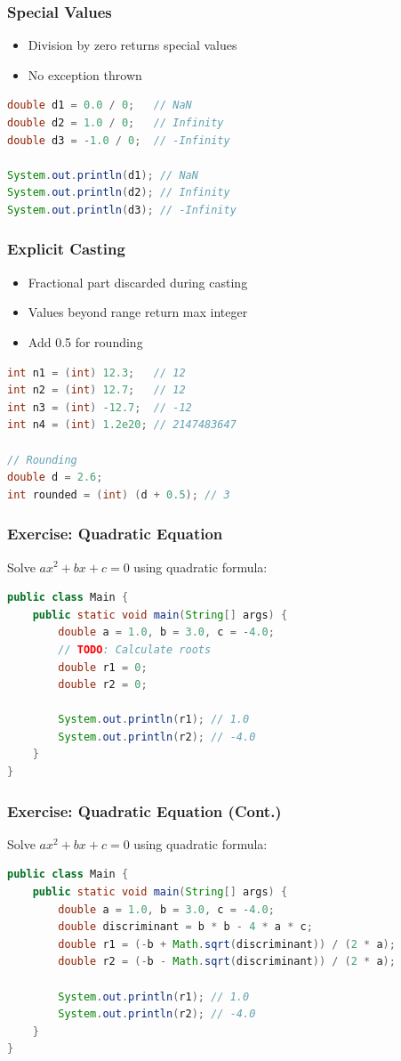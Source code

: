 \documentclass[serif, aspectratio=169]{beamer}
\begin{document}
\begin{frame}[fragile]
\frametitle{Special Values}
\begin{itemize}
    \item Division by zero returns special values
    \item No exception thrown
\end{itemize}
\begin{lstlisting}[language=Java]
double d1 = 0.0 / 0;   // NaN
double d2 = 1.0 / 0;   // Infinity
double d3 = -1.0 / 0;  // -Infinity

System.out.println(d1); // NaN
System.out.println(d2); // Infinity
System.out.println(d3); // -Infinity
\end{lstlisting}
\end{frame}

\begin{frame}[fragile]
\frametitle{Explicit Casting}
\begin{itemize}
    \item Fractional part discarded during casting
    \item Values beyond range return max integer
    \item Add 0.5 for rounding
\end{itemize}
\begin{lstlisting}[language=Java]
int n1 = (int) 12.3;   // 12
int n2 = (int) 12.7;   // 12
int n3 = (int) -12.7;  // -12
int n4 = (int) 1.2e20; // 2147483647

// Rounding
double d = 2.6;
int rounded = (int) (d + 0.5); // 3
\end{lstlisting}
\end{frame}

\begin{frame}[fragile]
\frametitle{Exercise: Quadratic Equation}
Solve $ax^2 + bx + c = 0$ using quadratic formula:
\begin{lstlisting}[language=Java]
public class Main {
    public static void main(String[] args) {
        double a = 1.0, b = 3.0, c = -4.0;
        // TODO: Calculate roots
        double r1 = 0;
        double r2 = 0;
        
        System.out.println(r1); // 1.0
        System.out.println(r2); // -4.0
    }
}
\end{lstlisting}
\end{frame}

\begin{frame}[fragile]
\frametitle{Exercise: Quadratic Equation (Cont.)}
Solve $ax^2 + bx + c = 0$ using quadratic formula:
\begin{lstlisting}[language=Java]
public class Main {
    public static void main(String[] args) {
        double a = 1.0, b = 3.0, c = -4.0;
        double discriminant = b * b - 4 * a * c;
        double r1 = (-b + Math.sqrt(discriminant)) / (2 * a);
        double r2 = (-b - Math.sqrt(discriminant)) / (2 * a);
        
        System.out.println(r1); // 1.0
        System.out.println(r2); // -4.0
    }
}
\end{lstlisting}
\end{frame}
\end{document}
